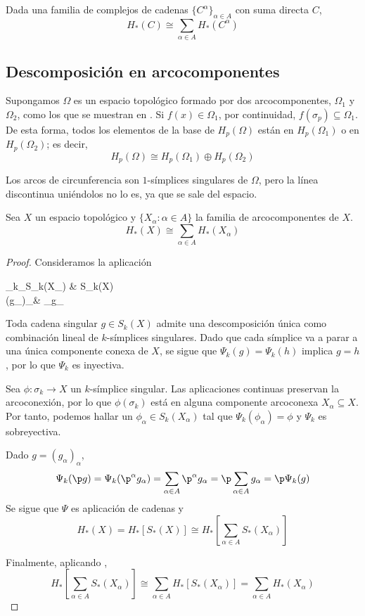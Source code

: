 \begin{lemma}
	Dada una familia de complejos de cadenas $\{C^\alpha\}_{\alpha \in A}$ con suma directa $C$,
	\[H_*(C)\cong\sum_{\alpha \in A}H_*(C^\alpha)\]
\end{lemma}

\subsection{Descomposición en arcocomponentes}
Supongamos $\Omega$ es un espacio topológico formado por dos arcocomponentes, $\Omega_1$ y $\Omega_2$, como los que se muestran en .
Si $f(x) \in \Omega_1$, por continuidad, $f(\sigma_p) \subseteq \Omega_1$.
De esta forma, todos los elementos de la base de $H_p(\Omega)$ están en $H_p(\Omega_1)$ o en $H_p(\Omega_2)$; es decir,
\[H_p(\Omega)\cong H_p(\Omega_1)\oplus H_p(\Omega_2)\]

\begin{marginfigure}
	
	\caption[Dos espacios arcoconexos.]{Los arcos de circunferencia son $1$-símplices singulares de $\Omega$, pero la línea discontinua uniéndolos no lo es, ya que se sale del espacio.}
\end{marginfigure}

\begin{proposition}
	Sea $X$ un espacio topológico y $\{X_\alpha\colon \alpha\in A\}$ la familia de arcocomponentes de $X$.
		\[H_*(X) \cong \sum_{\alpha \in A} H_*(X_\alpha)\]
\end{proposition}

\begin{proof}
	Consideramos la aplicación
	\begin{funcion*}
		\Psi_k\colon\sum_\alpha S_k(X_\alpha) \arrow[r] & S_k(X)          \\
		(g_\alpha)_\alpha \arrow[r, maps to]            & \sum_\alpha g_\alpha
	\end{funcion*}
	Toda cadena singular $g \in S_k(X)$ admite una descomposición única como combinación lineal de $k$-símplices singulares.
	Dado que cada símplice va a parar a una única componente conexa de $X$, se sigue que $\Psi_k(g)=\Psi_k(h)$ implica $g=h$, por lo que $\Psi_k$ es inyectiva.

	Sea $\phi\colon \sigma_k \to X$ un $k$-símplice singular.
	Las aplicaciones continuas preservan la arcoconexión, por lo que $\phi(\sigma_k)$ está en alguna componente arcoconexa $X_\alpha \subseteq X$.
	Por tanto, podemos hallar un $\phi_\alpha \in S_k(X_\alpha)$ tal que $\Psi_k(\phi_\alpha)=\phi$ y $\Psi_k$ es sobreyectiva.

	Dado $g=(g_\alpha)_\alpha$,
		\[\Psi_k(\p g)=\Psi_k({\p^\alpha g_\alpha})=\sum_{\alpha \in A}\p^\alpha g_\alpha=\p \sum_{\alpha \in A}g_\alpha=\p \Psi_k(g)\]
	Se sigue que $\Psi$ es aplicación de cadenas y
		\[H_*(X)=H_*[S_*(X)]\cong H_*\left[\sum_{\alpha \in A}S_*(X_\alpha)\right]\]

	Finalmente, aplicando ,
		\[H_*\left[\sum_{\alpha \in A}S_*(X_\alpha)\right]\cong\sum_{\alpha \in A}H_*[S_*(X_\alpha)]=\sum_{\alpha \in A}H_*\left(X_\alpha\right)\]
\end{proof}

